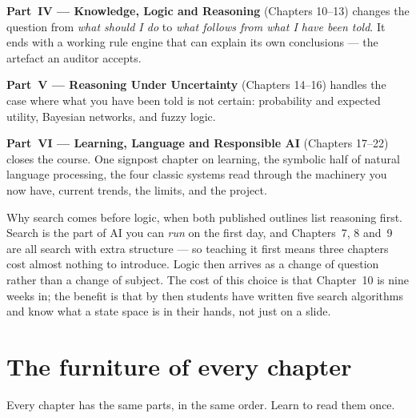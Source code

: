 \textbf{Part~IV --- Knowledge, Logic and Reasoning} (Chapters 10--13) changes the
question from \emph{what should I do} to \emph{what follows from what I have been
told}. It ends with a working rule engine that can explain its own conclusions ---
the artefact an auditor accepts.

\textbf{Part~V --- Reasoning Under Uncertainty} (Chapters 14--16) handles the case
where what you have been told is not certain: probability and expected utility,
Bayesian networks, and fuzzy logic.

\textbf{Part~VI --- Learning, Language and Responsible AI} (Chapters 17--22) closes
the course. One signpost chapter on learning, the symbolic half of natural language
processing, the four classic systems read through the machinery you now have,
current trends, the limits, and the project.

\begin{conceptbox}
Why search comes before logic, when both published outlines list reasoning first.
Search is the part of AI you can \emph{run} on the first day, and Chapters~7, 8
and~9 are all search with extra structure --- so teaching it first means three
chapters cost almost nothing to introduce. Logic then arrives as a change of
question rather than a change of subject. The cost of this choice is that
Chapter~10 is nine weeks in; the benefit is that by then students have written
five search algorithms and know what a state space is in their hands, not just on
a slide.
\end{conceptbox}

\section*{The furniture of every chapter}

Every chapter has the same parts, in the same order. Learn to read them once.

